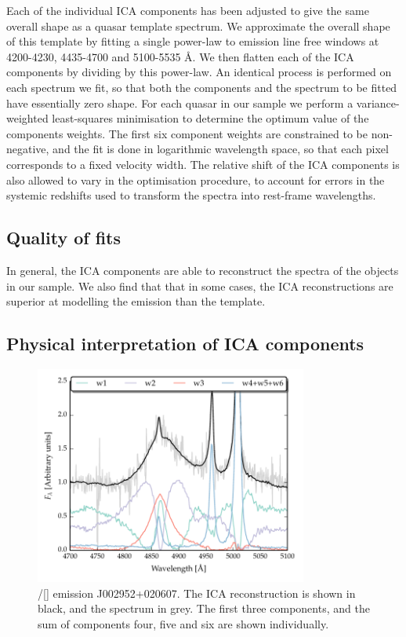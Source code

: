 Each of the individual ICA components has been adjusted to give the same overall shape as a quasar template spectrum. 
We approximate the overall shape of this template by fitting a single power-law to emission line free windows at 4200-4230, 4435-4700 and 5100-5535 \AA. 
We then flatten each of the ICA components by dividing by this power-law. 
An identical process is performed on each spectrum we fit, so that both the components and the spectrum to be fitted have essentially zero shape. 
For each quasar in our sample we perform a variance-weighted least-squares minimisation to determine the optimum value of the components weights.
The first six component weights are constrained to be non-negative, and the fit is done in logarithmic wavelength space, so that each pixel corresponds to a fixed velocity width.   
The relative shift of the ICA components is also allowed to vary in the optimisation procedure, to account for errors in the systemic redshifts used to transform the spectra into rest-frame wavelengths. 

\subsection{Quality of fits}

In general, the ICA components are able to reconstruct the spectra of the objects in our sample. 
We also find that that in some cases, the ICA reconstructions are superior at modelling the  emission than the \citet{boroson92} template. 

\subsection{Physical interpretation of ICA components}

\begin{figure}[t!]
    \centering
    \includegraphics[width=0.8\textwidth]{figures/chapter04/mfica_components.pdf} 
    \caption{\hbns/[] emission J002952+020607. The ICA reconstruction is shown in black, and the spectrum in grey. The first three components, and the sum of components four, five and six are shown individually.}     
    \label{fig:mfica_components}
\end{figure}

